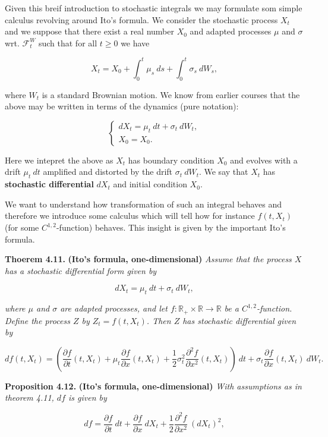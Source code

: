 \documentclass[
]{article}
\begin{document}
Given this breif introduction to stochastic integrals we may formulate
som simple calculus revolving around Ito's formula. We consider the
stochastic process \(X_t\) and we suppose that there exist a real number
\(X_0\) and adapted processes \(\mu\) and \(\sigma\) wrt.
\(\mathcal{F}_t^W\) such that for all \(t\ge0\) we have

\[
X_t=X_0+\int_0^t\mu_s\ ds+\int_0^t\sigma_s\ dW_s,\tag{4.16}
\]

where \(W_t\) is a standard Brownian motion. We know from earlier
courses that the above may be written in terms of the dynamics (pure
notation):

\[
\left\{\begin{matrix}dX_t=\mu_t\ dt+\sigma_t\ dW_t,\tag{4.17/18}\\ X_0=X_0.\end{matrix}\right.
\]

Here we intepret the above as \(X_t\) has boundary condition \(X_0\) and
evolves with a drift \(\mu_t\ dt\) amplified and distorted by the drift
\(\sigma_t\ dW_t\). We say that \(X_t\) has \textbf{stochastic
differential} \(dX_t\) and initial condition \(X_0\).

We want to understand how transformation of such an integral behaves and
therefore we introduce some calculus which will tell how for instance
\(f(t,X_t)\) (for some \(C^{1,2}\)-function) behaves. This insight is
given by the important Ito's formula.

\textbf{Thoerem 4.11.} \textbf{(Ito's formula, one-dimensional)}
\emph{Assume that the process \(X\) has a stochastic differential form
given by}

\[
dX_t=\mu_t\ dt + \sigma_t\ dW_t,\tag{4.28}
\]

\emph{where \(\mu\) and \(\sigma\) are adapted processes, and let
\(f:\mathbb{R}_+\times\mathbb{R}\to\mathbb{R}\) be a
\(C^{1,2}\)-function. Define the process \(Z\) by \(Z_t=f(t,X_t)\). Then
\(Z\) has stochastic differential given by}

\[
df(t,X_t)=\left(\frac{\partial f}{\partial t}(t,X_t) + \mu_t\frac{\partial f}{\partial x}(t,X_t) + \frac{1}{2}\sigma^2_t\frac{\partial^2 f}{\partial x^2}(t,X_t)\right)\ dt+\sigma_t\frac{\partial f}{\partial x}(t,X_t)\ dW_t.\tag{4.29}
\]

\textbf{Proposition 4.12.} \textbf{(Ito's formula, one-dimensional)}
\emph{With assumptions as in theorem 4.11, \(df\) is given by}

\[
df=\frac{\partial f}{\partial t}\ dt + \frac{\partial f}{\partial x}\ dX_t + \frac{1}{2}\frac{\partial^2 f}{\partial x^2}\ (dX_t)^2,\tag{4.31}
\]
\end{document}
